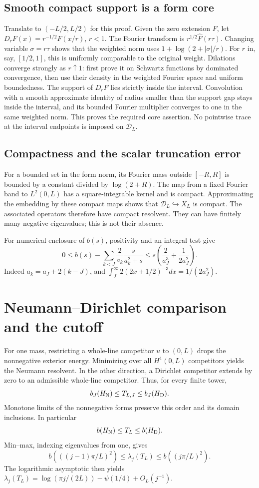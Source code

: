 \subsection{Smooth compact support is a form core}
Translate to $(-L/2,L/2)$ for this proof. Given the zero extension $F$,
let $D_rF(x)=r^{-1/2}F(x/r)$, $r<1$. The Fourier transform is
$r^{1/2}\widehat F(r\tau)$. Changing variable $\sigma=r\tau$ shows that
the weighted norm uses $1+\log(2+|\sigma|/r)$. For $r$ in, say,
$[1/2,1]$, this is uniformly comparable to the original weight.
Dilations converge strongly as $r\uparrow1$: first prove it on Schwartz
functions by dominated convergence, then use their density in the weighted
Fourier space and uniform boundedness. The support of $D_rF$ lies strictly
inside the interval. Convolution with a smooth approximate identity of
radius smaller than the support gap stays inside the interval, and its
bounded Fourier multiplier converges to one in the same weighted norm.
This proves the required core assertion. No pointwise trace at the
interval endpoints is imposed on $\mathcal D_L$.

\subsection{Compactness and the scalar truncation error}
For a bounded set in the form norm, its Fourier mass outside $[-R,R]$ is
bounded by a constant divided by $\log(2+R)$. The map from a fixed Fourier
band to $L^2(0,L)$ has a square-integrable kernel and is compact. Approximating
the embedding by these compact maps shows that $\mathcal D_L\hookrightarrow X_L$
is compact. The associated operators therefore have compact resolvent.
They can have finitely many negative eigenvalues; this is not their absence.

For numerical enclosure of $b(s)$, positivity and an integral test give
\begin{equation}\label{d:b-tail}
0\le b(s)-\sum_{k<J}\frac2{a_k}\frac{s}{a_k^2+s}
\le s\left(\frac2{a_J^3}+\frac1{2a_J^2}\right).
\end{equation}
Indeed $a_k=a_J+2(k-J)$, and
$\int_J^\infty 2(2x+1/2)^{-3}dx=1/(2a_J^2)$.

\section{Neumann--Dirichlet comparison and the cutoff}
For one mass, restricting a whole-line competitor $u$ to $(0,L)$ drops
the nonnegative exterior energy. Minimizing over all $H^1(0,L)$
competitors yields the Neumann resolvent. In the other direction, a
Dirichlet competitor extends by zero to an admissible whole-line
competitor. Thus, for every finite tower,
\[
b_J(H_{\rm N})\le T_{L,J}\le b_J(H_{\rm D}).
\]
Monotone limits of the nonnegative forms preserve this order and its
domain inclusions. In particular
\begin{equation}\label{d:ND}
b(H_{\rm N})\le T_L\le b(H_{\rm D}).
\end{equation}
Min--max, indexing eigenvalues from one, gives
\[
b(((j-1)\pi/L)^2)\le\lambda_j(T_L)\le b((j\pi/L)^2).
\]
The logarithmic asymptotic then yields
$\lambda_j(T_L)=\log(\pi j/(2L))-\psi(1/4)+O_L(j^{-1})$.

